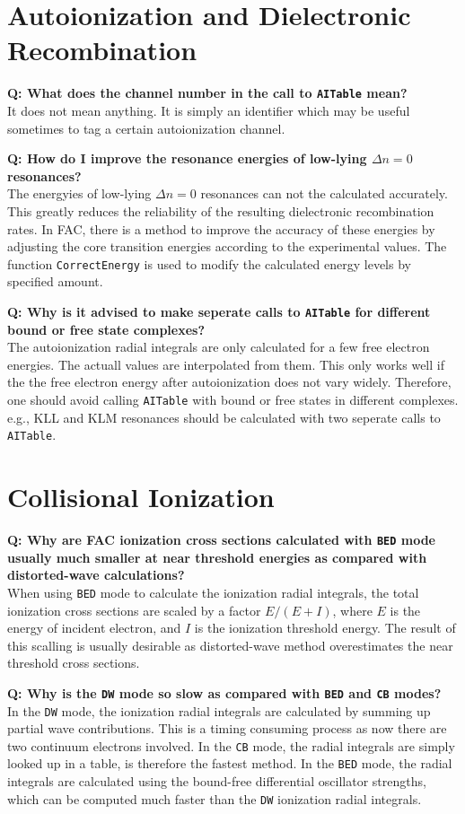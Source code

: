 \documentclass[twoside,letterpaper]{refrep}
\newcommand{\key}[1]{\texttt{#1}}
\newcounter{faq}[section]
\newcommand{\faq}[2]{\stepcounter{faq}
	\begin{minipage}{\textwidth}
	\textbf{Q\arabic{faq}: #1?}\\#2
	\end{minipage}}
\begin{document}
\section{Autoionization and Dielectronic Recombination}{
\faq{What does the channel number in the call to \key{AITable} mean}{
It does not mean anything. It is simply an identifier which may be useful
sometimes to tag a certain autoionization channel.}

\faq{How do I improve the resonance energies of low-lying $\Delta n = 0$
resonances}{
The energyies of low-lying $\Delta n = 0$ resonances can not the calculated
accurately. This greatly reduces the reliability of the resulting dielectronic
recombination rates. In FAC, there is a method to improve the accuracy of
these energies by adjusting the core transition energies according to the
experimental values. The function \key{CorrectEnergy} is used to modify the
calculated energy levels by specified amount.}

\faq{Why is it advised to make seperate calls to \key{AITable} for different
bound or free state complexes}{
The autoionization radial integrals are only calculated for a few free
electron energies. The actuall values are interpolated from them. This only
works well if the the free electron energy after autoionization does not vary
widely. Therefore, one should avoid calling \key{AITable} with bound or free
states in different complexes. e.g., KLL and KLM resonances should be
calculated with two seperate calls to \key{AITable}.}

\section{Collisional Ionization}
\faq{Why are FAC ionization cross sections calculated with \key{BED} mode
usually much smaller at near threshold energies as compared with
distorted-wave calculations}{
When using \key{BED} mode to calculate the ionization radial integrals, the
total ionization cross sections are scaled by a factor $E/(E+I)$, where $E$ is
the energy of incident electron, and $I$ is the ionization threshold
energy. The result of this scalling is usually desirable as distorted-wave
method overestimates the near threshold cross sections.}

\faq{Why is the \key{DW} mode so slow as compared with \key{BED} and \key{CB}
modes}{
In the \key{DW} mode, the ionization radial integrals are calculated by
summing up partial wave contributions. This is a timing consuming process as
now there are two continuum electrons involved. In the \key{CB} mode, the
radial integrals are simply looked up in a table, is therefore the fastest
method. In the \key{BED} mode, the radial integrals are calculated using the
bound-free differential oscillator strengths, which can be computed much
faster than the \key{DW} ionization radial integrals.}

}
\end{document}
